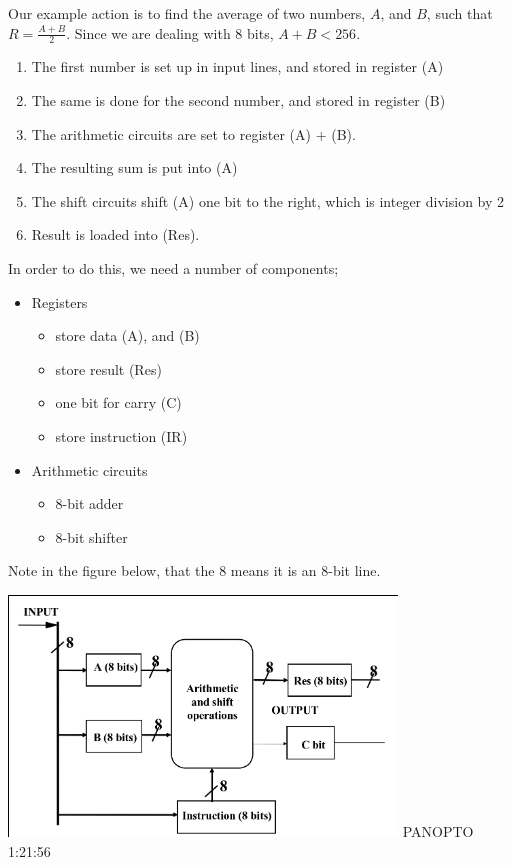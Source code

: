 \documentclass[a4paper, 12pt]{article}
\begin{document}
            Our example action is to find the average of two numbers, $A$, and $B$, such that $R = \frac{A + B}{2}$. Since we are dealing with 8 bits, $A + B < 256$.
            \begin{enumerate}[1.]
                \itemsep0em
                \item The first number is set up in input lines, and stored in register (A)
                \item The same is done for the second number, and stored in register (B)
                \item The arithmetic circuits are set to register (A) + (B).
                \item The resulting sum is put into (A)
                \item The shift circuits shift (A) one bit to the right, which is integer division by 2
                \item Result is loaded into (Res).
            \end{enumerate}
            In order to do this, we need a number of components;
            \begin{itemize}
                \itemsep0em
                \item Registers
                    \begin{itemize}
                        \itemsep0em
                        \item store data (A), and (B)
                        \item store result (Res)
                        \item one bit for carry (C)
                        \item store instruction (IR)
                    \end{itemize}
                \item Arithmetic circuits
                    \begin{itemize}
                        \itemsep0em
                        \item 8-bit adder
                        \item 8-bit shifter
                    \end{itemize}
            \end{itemize}
            Note in the figure below, that the 8 means it is an 8-bit line.

            \includegraphics[]{2019-04-08-15-00-51.png}
            PANOPTO 1:21:56
            \medskip
\end{document}
